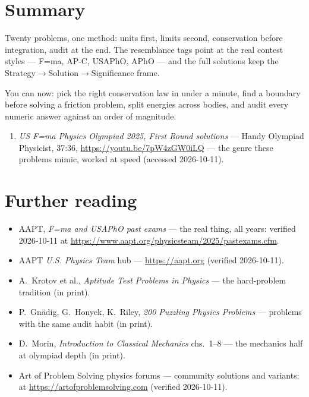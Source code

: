 \section{Summary}\label{sec:ws-summary}

Twenty problems, one method: units first, limits second, conservation
before integration, audit at the end. The resemblance tags point at the
real contest styles --- F=ma, AP-C, USAPhO, APhO --- and the full
solutions keep the Strategy$\to$Solution$\to$Significance frame.

\begin{wins}
You can now: pick the right conservation law in under a minute, find a
boundary before solving a friction problem, split energies across
bodies, and audit every numeric answer against an order of magnitude.
\end{wins}


\begin{rulebox}
\begin{enumerate}
\item \emph{US F=ma Physics Olympiad 2025, First Round solutions} ---
Handy Olympiad Physicist, 37:36, \url{https://youtu.be/7pW4zGW0iLQ}
--- the genre these problems mimic, worked at speed (accessed
2026-10-11).
\end{enumerate}
\end{rulebox}

\section*{Further reading}

\begin{itemize}
\item AAPT, \emph{F=ma and USAPhO past exams} --- the real thing, all
years: verified 2026-10-11 at
\url{https://www.aapt.org/physicsteam/2025/pastexams.cfm}.
\item AAPT \emph{U.S. Physics Team} hub --- \url{https://aapt.org}
(verified 2026-10-11).
\item A.~Krotov et al., \emph{Aptitude Test Problems in Physics} ---
the hard-problem tradition (in print).
\item P.~Gn\"adig, G.~Honyek, K.~Riley, \emph{200 Puzzling Physics
Problems} --- problems with the same audit habit (in print).
\item D.~Morin, \emph{Introduction to Classical Mechanics} chs.~1--8
--- the mechanics half at olympiad depth (in print).
\item Art of Problem Solving physics forums --- community solutions and
variants: at \url{https://artofproblemsolving.com} (verified
2026-10-11).
\end{itemize}
